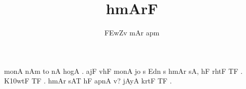 \def\DevnagVersion{2.17}\documentclass[12pt,a4paper]{article}
\title{\dn hmArF }
\author{\dn \3FEwZv \7{k}mAr a\7{n}pm}
\begin{document}
\maketitle
{\dn monA nAm to nA hogA . ajF vhF monA jo s Edn s\? hmAr\? sA, hF rhtF TF . K\?\310wtF TF . hmAr\? sAT hF apnA v? jAyA krtF TF .
 }
\end{document}
